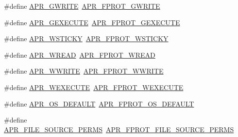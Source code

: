 \begin{DoxyCompactItemize}
\item 
\#define \mbox{\hyperlink{group__apr__file__permissions_ga794c425b459aa46939f6febabbe9daef}{A\+P\+R\+\_\+\+G\+W\+R\+I\+TE}}~\mbox{\hyperlink{group__apr__file__permissions_gacecdc9f88b04c768150418688b786500}{A\+P\+R\+\_\+\+F\+P\+R\+O\+T\+\_\+\+G\+W\+R\+I\+TE}}
\item 
\#define \mbox{\hyperlink{group__apr__file__permissions_ga79ce615a96a407d6c53325a2f8cdee3d}{A\+P\+R\+\_\+\+G\+E\+X\+E\+C\+U\+TE}}~\mbox{\hyperlink{group__apr__file__permissions_gab627bef3f9ceb84bbf00906eaeb12184}{A\+P\+R\+\_\+\+F\+P\+R\+O\+T\+\_\+\+G\+E\+X\+E\+C\+U\+TE}}
\item 
\#define \mbox{\hyperlink{group__apr__file__permissions_ga824d6685d59e3efddb6ee7fdbee69c13}{A\+P\+R\+\_\+\+W\+S\+T\+I\+C\+KY}}~\mbox{\hyperlink{group__apr__file__permissions_ga989dbea02f779a5f20a643d7e4ee9952}{A\+P\+R\+\_\+\+F\+P\+R\+O\+T\+\_\+\+W\+S\+T\+I\+C\+KY}}
\item 
\#define \mbox{\hyperlink{group__apr__file__permissions_ga5c987d2b1ace95b4ffa7c5a322721aad}{A\+P\+R\+\_\+\+W\+R\+E\+AD}}~\mbox{\hyperlink{group__apr__file__permissions_ga194718630250b0f0dd4be38c86dac717}{A\+P\+R\+\_\+\+F\+P\+R\+O\+T\+\_\+\+W\+R\+E\+AD}}
\item 
\#define \mbox{\hyperlink{group__apr__file__permissions_ga7aac61689e9aaa93176bdb4911f56863}{A\+P\+R\+\_\+\+W\+W\+R\+I\+TE}}~\mbox{\hyperlink{group__apr__file__permissions_ga51692a9828f5b6288d89495378944260}{A\+P\+R\+\_\+\+F\+P\+R\+O\+T\+\_\+\+W\+W\+R\+I\+TE}}
\item 
\#define \mbox{\hyperlink{group__apr__file__permissions_ga7bf4afea195c62f41aad1d3e94dcdac6}{A\+P\+R\+\_\+\+W\+E\+X\+E\+C\+U\+TE}}~\mbox{\hyperlink{group__apr__file__permissions_ga760d69c09b38ddf1e0aff09362d8ce11}{A\+P\+R\+\_\+\+F\+P\+R\+O\+T\+\_\+\+W\+E\+X\+E\+C\+U\+TE}}
\item 
\#define \mbox{\hyperlink{group__apr__file__permissions_ga8552adb50d545d5fc7faeabb4f4a388f}{A\+P\+R\+\_\+\+O\+S\+\_\+\+D\+E\+F\+A\+U\+LT}}~\mbox{\hyperlink{group__apr__file__permissions_gad3c65a67ee6eb12ecc6a33857397900b}{A\+P\+R\+\_\+\+F\+P\+R\+O\+T\+\_\+\+O\+S\+\_\+\+D\+E\+F\+A\+U\+LT}}
\item 
\#define \mbox{\hyperlink{group__apr__file__permissions_gaa72c8bc4ab1bd5615bee4333d23dc16b}{A\+P\+R\+\_\+\+F\+I\+L\+E\+\_\+\+S\+O\+U\+R\+C\+E\+\_\+\+P\+E\+R\+MS}}~\mbox{\hyperlink{group__apr__file__permissions_gac08d4e868c7c9532f7c97c70556663dc}{A\+P\+R\+\_\+\+F\+P\+R\+O\+T\+\_\+\+F\+I\+L\+E\+\_\+\+S\+O\+U\+R\+C\+E\+\_\+\+P\+E\+R\+MS}}
\end{DoxyCompactItemize}


